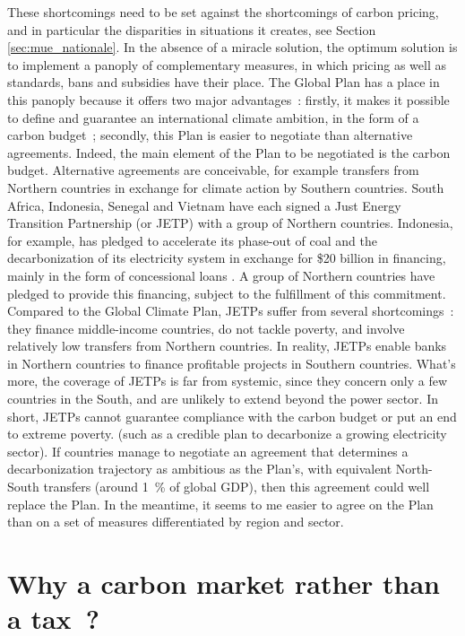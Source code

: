 \documentclass[a5paper,french,openany]{memoir}
\begin{document}
{{These shortcomings need to be set against the shortcomings of carbon pricing, and in particular the disparities in situations it creates, see Section \ref{sec:mue_nationale}. In the absence of a miracle solution, the optimum solution is to implement a panoply of complementary measures, in which pricing as well as standards, bans and subsidies have their place. The Global Plan has a place in this panoply because it offers two major advantages~: firstly, it makes it possible to define and guarantee an international climate ambition, in the form of a carbon budget~; secondly, this Plan is easier to negotiate than alternative agreements. Indeed, the main element of the Plan to be negotiated is the carbon budget. Alternative agreements are conceivable, for example transfers from Northern countries in exchange for climate action by Southern countries. South Africa, Indonesia, Senegal and Vietnam have each signed a Just Energy Transition Partnership (or JETP) with a group of Northern countries. Indonesia, for example, has pledged to accelerate its phase-out of coal and the decarbonization of its electricity system in exchange for \$20 billion in financing, mainly in the form of concessional loans \citep{ha-duong_just_2023}. A group of Northern countries have pledged to provide this financing, subject to the fulfillment of this commitment. Compared to the Global Climate Plan, JETPs suffer from several shortcomings~: they finance middle-income countries, do not tackle poverty, and involve relatively low transfers from Northern countries. In reality, JETPs enable banks in Northern countries to finance profitable projects in Southern countries. What's more, the coverage of JETPs is far from systemic, since they concern only a few countries in the South, and are unlikely to extend beyond the power sector. In short, JETPs cannot guarantee compliance with the carbon budget or put an end to extreme poverty}. 
(such as a credible plan to decarbonize a growing electricity sector). If countries manage to negotiate an agreement that determines a decarbonization trajectory as ambitious as the Plan's, with equivalent North-South transfers (around 1~\% of global GDP), then this agreement could well replace the Plan. In the meantime, it seems to me easier to agree on the Plan than on a set of measures differentiated by region and sector.


\section*{\normalsize Why a carbon market rather than a tax~?}\label{q:tax}

}
\end{document}
